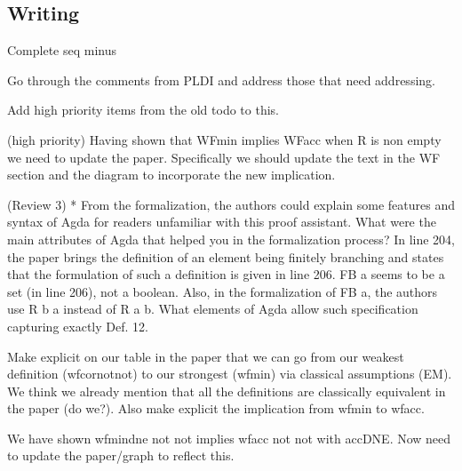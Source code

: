 \documentclass{article}
\newcommand{\cmark}{\ding{51}}%
\newcommand{\done}{\rlap{$\square$}{\raisebox{2pt}{\large\hspace{1pt}\cmark}}%
\hspace{-2.5pt}}
\begin{document}
\subsection*{Writing}
\begin{todolist}
    \item Complete seq minus
    \item Go through the comments from PLDI and address those that need addressing.
    \item Add high priority items from the old todo to this.
    \item [\done] (high priority) Having shown that WFmin implies WFacc when R is non empty we need to update the paper. Specifically we should update the text in the WF section and the diagram to incorporate the new implication.  
    \item (Review 3) * From the formalization, the authors could explain some features and syntax of Agda for readers unfamiliar with this proof assistant. What were the main attributes of Agda that helped you in the formalization process? In line 204, the paper brings the definition of an element being finitely branching and states that the formulation of such a definition is given in line 206. FB a seems to be a set (in line 206), not a boolean. Also, in the formalization of FB a, the authors use R b a instead of R a b. What elements of Agda allow such specification capturing exactly Def. 12.
    \item [\done] Make explicit on our table in the paper that we can go from our weakest definition (wfcornotnot) to our strongest (wfmin) via classical assumptions (EM). We think we already mention that all the definitions are classically equivalent in the paper (do we?).  Also make explicit the implication from wfmin to wfacc. 
    \item [\done] We have shown wfmindne not not implies wfacc not not with accDNE. Now need to update the paper/graph to reflect this. 

\end{todolist}
\end{document}
